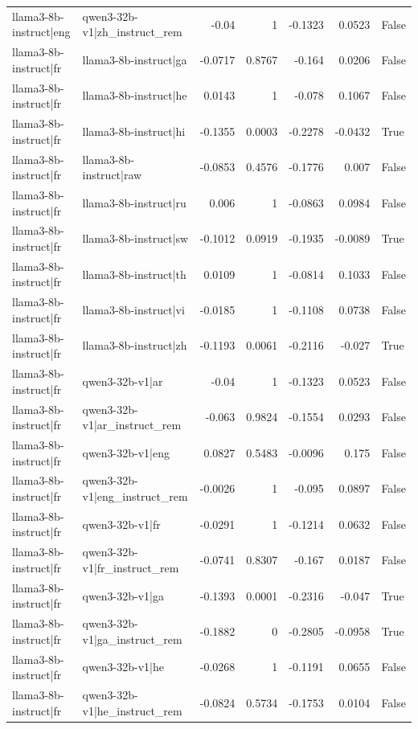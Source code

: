 \begin{table}
\begin{tabular}{l l r r r r l}
llama3-8b-instruct|eng & qwen3-32b-v1|zh_instruct_rem & -0.04 & 1 & -0.1323 & 0.0523 & False \\
llama3-8b-instruct|fr & llama3-8b-instruct|ga & -0.0717 & 0.8767 & -0.164 & 0.0206 & False \\
llama3-8b-instruct|fr & llama3-8b-instruct|he & 0.0143 & 1 & -0.078 & 0.1067 & False \\
llama3-8b-instruct|fr & llama3-8b-instruct|hi & -0.1355 & 0.0003 & -0.2278 & -0.0432 & True \\
llama3-8b-instruct|fr & llama3-8b-instruct|raw & -0.0853 & 0.4576 & -0.1776 & 0.007 & False \\
llama3-8b-instruct|fr & llama3-8b-instruct|ru & 0.006 & 1 & -0.0863 & 0.0984 & False \\
llama3-8b-instruct|fr & llama3-8b-instruct|sw & -0.1012 & 0.0919 & -0.1935 & -0.0089 & True \\
llama3-8b-instruct|fr & llama3-8b-instruct|th & 0.0109 & 1 & -0.0814 & 0.1033 & False \\
llama3-8b-instruct|fr & llama3-8b-instruct|vi & -0.0185 & 1 & -0.1108 & 0.0738 & False \\
llama3-8b-instruct|fr & llama3-8b-instruct|zh & -0.1193 & 0.0061 & -0.2116 & -0.027 & True \\
llama3-8b-instruct|fr & qwen3-32b-v1|ar & -0.04 & 1 & -0.1323 & 0.0523 & False \\
llama3-8b-instruct|fr & qwen3-32b-v1|ar_instruct_rem & -0.063 & 0.9824 & -0.1554 & 0.0293 & False \\
llama3-8b-instruct|fr & qwen3-32b-v1|eng & 0.0827 & 0.5483 & -0.0096 & 0.175 & False \\
llama3-8b-instruct|fr & qwen3-32b-v1|eng_instruct_rem & -0.0026 & 1 & -0.095 & 0.0897 & False \\
llama3-8b-instruct|fr & qwen3-32b-v1|fr & -0.0291 & 1 & -0.1214 & 0.0632 & False \\
llama3-8b-instruct|fr & qwen3-32b-v1|fr_instruct_rem & -0.0741 & 0.8307 & -0.167 & 0.0187 & False \\
llama3-8b-instruct|fr & qwen3-32b-v1|ga & -0.1393 & 0.0001 & -0.2316 & -0.047 & True \\
llama3-8b-instruct|fr & qwen3-32b-v1|ga_instruct_rem & -0.1882 & 0 & -0.2805 & -0.0958 & True \\
llama3-8b-instruct|fr & qwen3-32b-v1|he & -0.0268 & 1 & -0.1191 & 0.0655 & False \\
llama3-8b-instruct|fr & qwen3-32b-v1|he_instruct_rem & -0.0824 & 0.5734 & -0.1753 & 0.0104 & False \\

\end{tabular}
\end{table}
